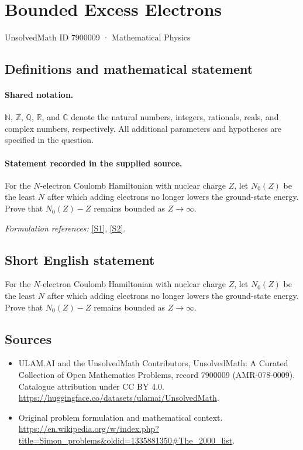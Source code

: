 \documentclass[11pt]{article}
\newcommand{\sref}[2]{\hyperlink{source:#1:#2}{[S#2]}}
\begin{document}
\setcounter{section}{7900008}
\section{Bounded Excess Electrons}\label{7900009}
{\small UnsolvedMath ID 7900009 · Mathematical Physics}
\subsection{Definitions and mathematical statement}

\paragraph{Shared notation.}$\mathbb N$, $\mathbb Z$, $\mathbb Q$, $\mathbb R$, and $\mathbb C$ denote the natural numbers, integers, rationals, reals, and complex numbers, respectively. All additional parameters and hypotheses are specified in the question.


\paragraph{Statement recorded in the supplied source.}
For the $N$-electron Coulomb Hamiltonian with nuclear charge $Z$, let $N_0(Z)$ be the least $N$ after which adding electrons no longer lowers the ground-state energy. Prove that $N_0(Z)-Z$ remains bounded as $Z\to\infty$.
\par\smallskip\textit{Formulation references:} \sref{7900009}{1}, \sref{7900009}{2}.
\subsection{Short English statement}
For the $N$-electron Coulomb Hamiltonian with nuclear charge $Z$, let $N_0(Z)$ be the least $N$ after which adding electrons no longer lowers the ground-state energy. Prove that $N_0(Z)-Z$ remains bounded as $Z\to\infty$.
\subsection{Sources}
\begin{itemize}
\item[\hypertarget{source:7900009:1}{S1}] ULAM.AI and the UnsolvedMath Contributors, UnsolvedMath: A Curated Collection of Open Mathematics Problems, record 7900009 (AMR-078-0009). Catalogue attribution under CC BY 4.0.
\url{https://huggingface.co/datasets/ulamai/UnsolvedMath}.
\item[\hypertarget{source:7900009:2}{S2}] Original problem formulation and mathematical context.
\url{https://en.wikipedia.org/w/index.php?title=Simon_problems&oldid=1335881350#The_2000_list}.
\end{itemize}
\label{end:7900009}
\end{document}
